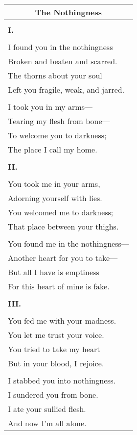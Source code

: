 \documentclass{article}
\begin{document}
\newcommand{\h}{\hspace*{2ex}}
\newcommand{\hh}{\hspace*{4ex}}
\newcommand{\hhh}{\hspace*{6ex}}

\begin{center}
\begin{tabular}{l}
\multicolumn{1}{c}{\textbf{The Nothingness}} \\\hline
\\
\textbf{I.} \\
\\
I found you in the nothingness \\
\h{}Broken and beaten and scarred. \\
\hh{}The thorns about your soul \\
\hhh{}Left you fragile, weak, and jarred. \\
\\
I took you in my arms--- \\
\h{}Tearing my flesh from bone--- \\
\hh{}To welcome you to darkness; \\
\hhh{}The place I call my home. \\
\\
\textbf{II.} \\
\\
You took me in your arms, \\
\h{}Adorning yourself with lies. \\
\hh{}You welcomed me to darkness; \\
\hhh{}That place between your thighs. \\
\\
You found me in the nothingness--- \\
\h{}Another heart for you to take--- \\
\hh{}But all I have is emptiness \\
\hhh{}For this heart of mine is fake. \\
\\
\textbf{III.} \\
\\
You fed me with your madness. \\
\h{}You let me trust your voice. \\
\hh{}You tried to take my heart \\
\hhh{}But in your blood, I rejoice. \\
\\
I stabbed you into nothingness. \\
\h{}I sundered you from bone. \\
\hh{}I ate your sullied flesh. \\
\hhh{}And now I'm all alone. \\
\end{tabular}
\end{center}
\end{document}
